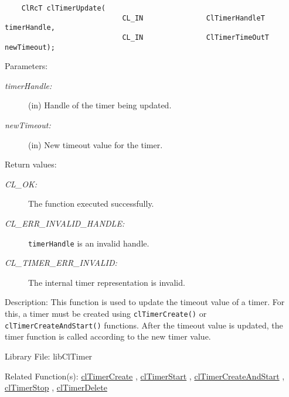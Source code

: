 \begin{flushleft}
\begin{Desc}
\footnotesize\begin{verbatim}    ClRcT clTimerUpdate(
               				CL_IN               ClTimerHandleT timerHandle,
               				CL_IN               ClTimerTimeOutT newTimeout);
\end{verbatim}
\normalsize
\end{Desc}
\begin{Desc}
\item[Parameters:]
\begin{description}
\item[{\em timer\-Handle:}](in) Handle of the timer being updated. \item[{\em new\-Timeout:}](in) New timeout value for the timer.\end{description}
\end{Desc}
\begin{Desc}
\item[Return values:]
\begin{description}
\item[{\em CL\_\-OK:}]The function executed successfully. 
\item[{\em CL\_\-ERR\_\-INVALID\_\-HANDLE:}]{\tt{timerHandle}} is an invalid handle. 
\item[{\em CL\_\-TIMER\_\-ERR\_\-INVALID:}]The internal timer representation is invalid.\end{description}
\end{Desc}
\begin{Desc}
\item[Description:]This function is used to update the timeout value of a timer. For this, a timer must be created using 
{\tt{clTimerCreate()}} or {\tt{clTimerCreateAndStart()}} functions. After the timeout value is updated, the timer function is called according to 
the new timer value.\end{Desc}
\begin{Desc}
\item[Library File:]lib\-Cl\-Timer\end{Desc}
\begin{Desc}
\item[Related Function(s):]\hyperlink{group__group33}{cl\-Timer\-Create} , \hyperlink{group__group33}{cl\-Timer\-Start} , \hyperlink{group__group33}{cl\-Timer\-Create\-And\-Start} , \hyperlink{group__group33}{cl\-Timer\-Stop} , \hyperlink{group__group33}{cl\-Timer\-Delete} \end{Desc}
\newpage



\end{flushleft}
